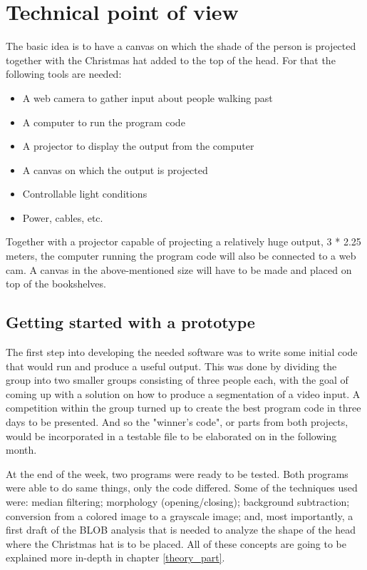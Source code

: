 \section{Technical point of view}
The basic idea is to have a canvas on which the shade of the person is projected together with the Christmas hat added to the top of the head. For that the following tools are needed:

\begin{itemize}
\item A web camera to gather input about people walking past
\item A computer to run the program code
\item A projector to display the output from the computer
\item A canvas on which the output is projected
\item Controllable light conditions
\item Power, cables, etc.
\end{itemize}

Together with a projector capable of projecting a relatively huge output, 3 * 2.25 meters, the computer running the program code will also be connected to a web cam. A canvas in the above-mentioned size will have to be made and placed on top of the bookshelves.

\subsection{Getting started with a prototype}
The first step into developing the needed software was to write some initial code that would run and produce a useful output. This was done by dividing the group into two smaller groups consisting of three people each, with the goal of coming up with a solution on how to produce a segmentation of a video input. A competition within the group turned up to create the best program code in three days to be presented. And so the "winner's code", or parts from both projects, would be incorporated in a testable file to be elaborated on in the following month.

At the end of the week, two programs were ready to be tested. Both programs were able to do same things, only the code differed. Some of the techniques used were: median filtering; morphology (opening/closing); background subtraction; conversion from a colored image to a grayscale image; and, most importantly, a first draft of the BLOB analysis that is needed to analyze the shape of the head where the Christmas hat is to be placed. All of these concepts are going to be explained more in-depth in chapter \ref{theory_part}.

